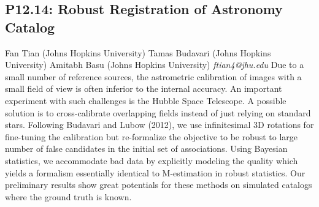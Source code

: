 \documentclass{report}
\begin{document}
\subsection*{P12.14: Robust Registration of Astronomy Catalog}
\bigskip
Fan Tian (Johns Hopkins University) \newline Tamas Budavari (Johns Hopkins University) \newline  Amitabh Basu (Johns Hopkins University)\newline   \newline  \newline  \newline\newline
{\it ftian4@jhu.edu}\newline
\newline\newline
Due to a small number of reference sources, the astrometric calibration of images with a small field of view is often inferior to the internal accuracy. An important experiment with such challenges is the Hubble Space Telescope. A possible solution is to cross-calibrate overlapping fields instead of just relying on standard stars. Following Budavari and Lubow (2012), we use infinitesimal 3D rotations for fine-tuning the calibration but re-formalize the objective to be robust to large number of false candidates in the initial set of associations. Using Bayesian statistics, we accommodate bad data by explicitly modeling the quality which yields a formalism essentially identical to M-estimation in robust statistics. Our preliminary results show great potentials for these methods on simulated catalogs where the ground truth is known.\newline
\newpage
\end{document}
